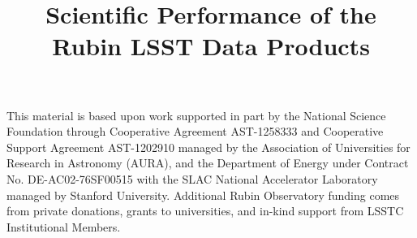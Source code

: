 \documentclass[twocolumn]{aastex631}
\begin{document}

\title{Scientific Performance of the Rubin LSST Data Products}







\begin{acknowledgments}
This material is based upon work supported in part by the National Science Foundation through Cooperative Agreement AST-1258333 and Cooperative Support Agreement AST-1202910 managed by the Association of Universities for Research in Astronomy (AURA), and the Department of Energy under Contract No. DE-AC02-76SF00515 with the SLAC National Accelerator Laboratory managed by Stanford University.
Additional Rubin Observatory funding comes from private donations, grants to universities, and in-kind support from LSSTC Institutional Members.
\end{acknowledgments}


\label{sec:bib}

\end{document}
